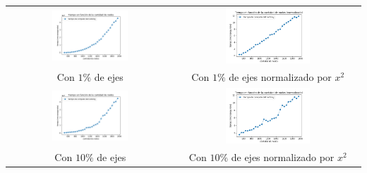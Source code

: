 \begin{minipage}{\textwidth}
\begin{center}
                    \begin{tabular}{cc}
                        \includegraphics[width=0.475\textwidth]{img/tiempo_nodos_prop_500-2000_solo_e100.png}
                       & 
                        \includegraphics[width=0.475\textwidth]{img/tiempo_nodos_prop_500-2000-normalizado-e100.png}								\\
                        Con $1\%$ de ejes & Con $1\%$ de ejes normalizado por $x^{2}$ \\
                        \includegraphics[width=0.475\textwidth]{img/tiempo_nodos_prop_500-2000_solo_e10.png} 
       & \includegraphics[width=0.475\textwidth]{img/tiempo_nodos_prop_500-2000-normalizado-e10.png} \\
             Con $10\%$ de ejes & Con $10\%$ de ejes normalizado por $x^{2}$ \\

\end{tabular}
\end{center}
\end{minipage}
